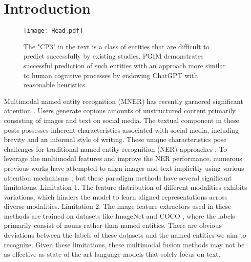 \documentclass[11pt]{article}
\begin{document}
\section{Introduction}
\begin{figure}[h]
  \scriptsize
      \setlength{\belowcaptionskip}{-0.5cm}
    \centering  
    \texttt{[image: Head.pdf]}
  \caption{The "CP3" in the text is a class of entities that are difficult to predict successfully by existing studies. PGIM demonstrates successful prediction of such entities with an approach more similar to human cognitive processes by endowing ChatGPT with reasonable heuristics.}
  \label{headphoto}
\end{figure}
Multimodal named entity recognition (MNER) has recently  garnered significant attention \citep{lu2018visual}. Users generate copious amounts of unstructured content primarily consisting of images and text on social media. The textual component in these posts possesses inherent characteristics associated with social media, including brevity and an informal style of writing. 
These unique characteristics pose challenges for traditional named entity recognition (NER) approaches \citep{chiu2016named,devlin2018bert}. 
To leverage the multimodal features and improve the NER performance, numerous previous works have attempted to align images and text implicitly using various attention mechanisms \citep{yu2020improving,sun2021rpbert}, but these  paradigm methods have several significant limitations. 
Limitation 1. The feature distribution of different modalities exhibits variations, which hinders the model to learn aligned representations across diverse modalities. Limitation 2. The image feature extractors used in these methods are trained on datasets like ImageNet \citep{deng2009imagenet} and COCO \citep{lin2014microsoft}, where the labels primarily consist of nouns rather than named entities. There are obvious deviations between the labels of these datasets and the named entities we aim to recognize. 
Given these limitations, these multimodal fusion methods may not be as effective as state-of-the-art language models that solely focus on text. 
\end{document}
